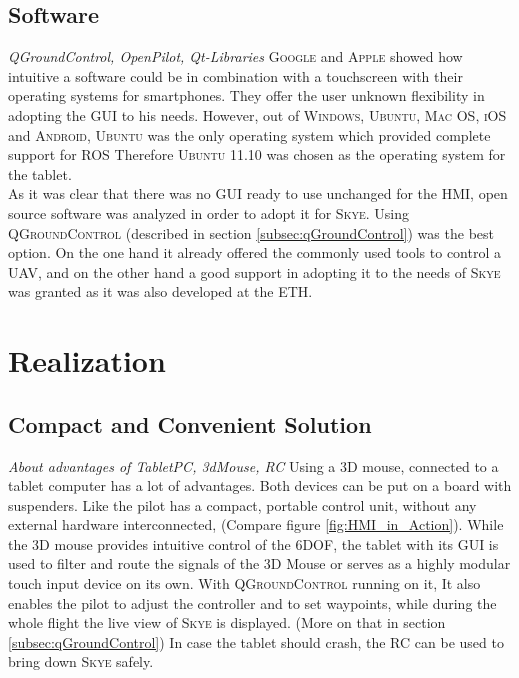 \subsection{Software}
\textit{QGroundControl, OpenPilot, Qt-Libraries}
\textsc{Google} and \textsc{Apple} showed how intuitive a software could be in combination with a  touchscreen with their operating systems for smartphones. They offer the user unknown flexibility in adopting the GUI to his needs. However, out of \textsc{Windows}, \textsc{Ubuntu}, \textsc{Mac OS}, \textsc{iOS} and \textsc{Android}, \textsc{Ubuntu} was the only operating system which provided complete support for \textsc{ROS}  Therefore \textsc{Ubuntu 11.10} was chosen as the operating system for the tablet.\\
As it was clear that there was no GUI ready to use unchanged for the HMI, open source software was analyzed in order to adopt it for \textsc{Skye}. Using \textsc{QGroundControl} (described in section \ref{subsec:qGroundControl}) was the best option. On the one hand it already offered the commonly used tools to control a UAV, and on the other hand a good support in adopting it to the needs of \textsc{Skye} was granted as it was also developed at the \textsc{ETH}.




\section{Realization}
\label{sec:realization}



\subsection{Compact and Convenient Solution}
\textit{About advantages of TabletPC, 3dMouse, RC}
Using a 3D mouse, connected to a tablet computer has a lot of advantages. Both devices can be put on a board with suspenders. Like the pilot has a compact, portable control unit, without any external hardware interconnected, (Compare figure \ref{fig:HMI_in_Action}). While the 3D mouse provides intuitive control of the 6DOF, the tablet with its GUI is used to filter and route the signals of the 3D Mouse or serves as a highly modular touch input device on its own. With \textsc{QGroundControl} running on it, It also enables the pilot to adjust the controller and to set waypoints, while during the whole flight the live view of \textsc{Skye} is displayed. (More on that in section \ref{subsec:qGroundControl}) In case the tablet should crash, the RC can be used to bring down \textsc{Skye} safely.

